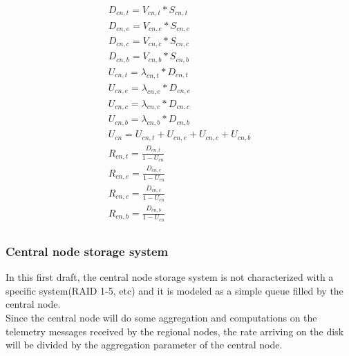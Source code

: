 \documentclass[11pt]{article}
\begin{document}
\begin{equation}
	\begin{array}{l}
		D_{cn, t} = V_{cn, t} * S_{cn, t} \\
		D_{cn, e} = V_{cn, e} * S_{cn, e} \\
		D_{cn, c} = V_{cn, c} * S_{cn, c} \\
		D_{cn, b} = V_{cn, b} * S_{cn, b} \\
		U_{cn, t} = \lambda_{cn, t} * D_{cn, t} \\
		U_{cn, e} = \lambda_{cn, e} * D_{cn, e} \\
		U_{cn, c} = \lambda_{cn, c} * D_{cn, c} \\
		U_{cn, b} = \lambda_{cn, b} * D_{cn, b} \\
		U_{cn} = U_{cn, t} + U_{cn, e} + U_{cn, c} + U_{cn, b} \\
		R_{cn, t} = \frac{D_{cn, t}}{1 - U_{cn}} \\
		R_{cn, e} = \frac{D_{cn, e}}{1 - U_{cn}} \\
		R_{cn, c} = \frac{D_{cn, c}}{1 - U_{cn}} \\
		R_{cn, b} = \frac{D_{cn, b}}{1 - U_{cn}} \\
	\end{array}
\end{equation}

\subsubsection{Central node storage system}
In this first draft, the central node storage system is not characterized with a specific system(RAID 1-5, etc) and it is modeled as a simple queue filled by the central node.\\
Since the central node will do some aggregation and computations on the telemetry messages received by the regional nodes, the rate arriving on the disk will be divided by the aggregation parameter of the central node.\\
\end{document}
